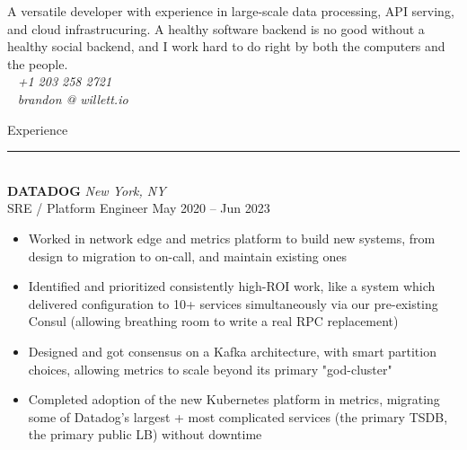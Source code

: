 \documentclass[letterpaper]{article}
\begin{document}
	\begin{bgbox}[height=\paperheight, colback=white, width=0.62\textwidth]\raggedright
		\vspace*{9pt}
		\begin{bgbox}[height=1.60in, colback=gray!15, width=\textwidth, top=0.05in]\raggedright
			A versatile developer with experience in large-scale data processing, API serving, and cloud infrastrucuring. A healthy software backend is no good without a healthy social backend, and I work hard to do right by both the computers and the people. \\[-16pt]
			\null \hfill {\large\Telefon}~ \textit{+1 203 258 2721} \\[-16pt]
			\null \hfill {\large\Letter}~ \textit{brandon @ willett.io }
		\end{bgbox}\vspace*{25.5pt}
		{\Huge{Experience}}\\[-6pt]
		\noindent\rule{\textwidth}{1pt}\\[12pt]
		\textbf{DATADOG} \hfill \textit{New York, NY}\\
		SRE / Platform Engineer \hfill May 2020 -- Jun 2023
		\begin{itemize} [noitemsep,topsep=4pt]
			\item Worked in network edge and metrics platform to build new systems, from design to migration to on-call, and maintain existing ones
			\item Identified and prioritized consistently high-ROI work, like a system which delivered configuration to 10+ services simultaneously via our pre-existing Consul (allowing breathing room to write a real RPC replacement)
			\item Designed and got consensus on a Kafka architecture, with smart partition choices, allowing metrics to scale beyond its primary "god-cluster"
			\item Completed adoption of the new Kubernetes platform in metrics, migrating some of Datadog's largest + most complicated services (the primary TSDB, the primary public LB) without downtime

\end{itemize}
\end{bgbox}
\end{document}
